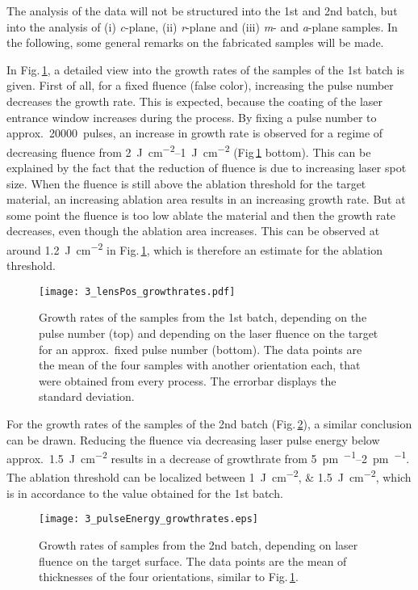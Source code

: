 The analysis of the data will not be structured into the 1st and 2nd batch, but into the analysis of (i) \textit{c}-plane, (ii) \textit{r}-plane and (iii) \textit{m}- and \textit{a}-plane samples.
In the following, some general remarks on the fabricated samples will be made.

In Fig.\,\ref{Fig:Results_3_lensGrowthRate}, a detailed view into the growth rates of the samples of the 1st batch is given.
First of all, for a fixed fluence (false color), increasing the pulse number decreases the growth rate.
This is expected, because the coating of the laser entrance window increases during the process.
By fixing a pulse number to approx.\ \qty{20000}{pulses}, an increase in growth rate is observed for a regime of decreasing fluence from \qtyrange{2}{1}{\joule\per\cm\squared} (Fig\,\ref{Fig:Results_3_lensGrowthRate} bottom).
This can be explained by the fact that the reduction of fluence is due to increasing laser spot size.
When the fluence is still above the ablation threshold for the target material, an increasing ablation area results in an increasing growth rate.
But at some point the fluence is too low ablate the material and then the growth rate decreases, even though the ablation area increases.
This can be observed at around \qty{1.2}{\joule\per\cm\squared} in Fig.\,\ref{Fig:Results_3_lensGrowthRate}, which is therefore an estimate for the ablation threshold.
\begin{figure}
    \centering
    \texttt{[image: 3\_lensPos\_growthrates.pdf]}
    \caption{
    Growth rates of the samples from the 1st batch, depending on the pulse number (top) and depending on the laser fluence on the target for an approx.\ fixed pulse number (bottom).
    The data points are the mean of the four samples with another orientation each, that were obtained from every process.
    The errorbar displays the standard deviation.
    }
    \label{Fig:Results_3_lensGrowthRate}
\end{figure}
%
For the growth rates of the samples of the 2nd batch (Fig.\,\ref{Fig:Results_3_pulseGrowthRate}), a similar conclusion can be drawn.
Reducing the fluence via decreasing laser pulse energy below approx.\ \qty{1.5}{\joule\per\cm\squared} results in a decrease of growthrate from \qtyrange{5}{2}{\pm\per\pulse}.
The ablation threshold can be localized between \qtylist{1;1.5}{\joule\per\cm\squared}, which is in accordance to the value obtained for the 1st batch.
\begin{figure}
    \centering
    \texttt{[image: 3\_pulseEnergy\_growthrates.eps]}
    \caption{Growth rates of samples from the 2nd batch, depending on laser fluence on the target surface.
    The data points are the mean of thicknesses of the four orientations, similar to Fig.\,\ref{Fig:Results_3_lensGrowthRate}.}
    \label{Fig:Results_3_pulseGrowthRate}
\end{figure}